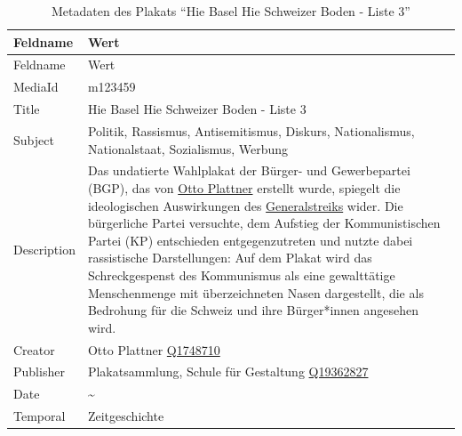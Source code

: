 \documentclass[
  nswissgerman,
  letterpaper,
  DIV=11,
  numbers=noendperiod]{scrartcl}
\begin{document}
\begin{longtable}[]{@{}
  >{\raggedright\arraybackslash}p{}
  >{\raggedright\arraybackslash}p{}@{}}
\caption{Metadaten des Plakats ``Hie Basel Hie Schweizer Boden - Liste
3''}\label{tbl-metadaten-hie-basel-hie-schweizer-boden-liste-3}\tabularnewline
\toprule\noalign{}
\begin{minipage}[b]{\linewidth}\raggedright
Feldname
\end{minipage} & \begin{minipage}[b]{\linewidth}\raggedright
Wert
\end{minipage} \\
\midrule\noalign{}
\endfirsthead
\toprule\noalign{}
\begin{minipage}[b]{\linewidth}\raggedright
Feldname
\end{minipage} & \begin{minipage}[b]{\linewidth}\raggedright
Wert
\end{minipage} \\
\midrule\noalign{}
\endhead
\bottomrule\noalign{}
\endlastfoot
MediaId & m123459 \\
Title & Hie Basel Hie Schweizer Boden - Liste 3 \\
Subject & Politik, Rassismus, Antisemitismus, Diskurs, Nationalismus,
Nationalstaat, Sozialismus, Werbung \\
Description & Das undatierte Wahlplakat der Bürger- und Gewerbepartei
(BGP), das von
\href{https://hls-dhs-dss.ch/de/articles/048316/2010-09-28/}{Otto
Plattner} erstellt wurde, spiegelt die ideologischen Auswirkungen des
\href{https://www.baslerstadtbuch.ch/chronik/1919/08/01/am-donnerstag-31-juli-brach-in-basel-ein-generalstreik-aus.html}{Generalstreiks}
wider. Die bürgerliche Partei versuchte, dem Aufstieg der
Kommunistischen Partei (KP) entschieden entgegenzutreten und nutzte
dabei rassistische Darstellungen: Auf dem Plakat wird das
Schreckgespenst des Kommunismus als eine gewalttätige Menschenmenge mit
überzeichneten Nasen dargestellt, die als Bedrohung für die Schweiz und
ihre Bürger*innen angesehen wird. \\
Creator & Otto Plattner
\href{https://www.wikidata.org/wiki/Q1748710}{Q1748710} \\
Publisher & Plakatsammlung, Schule für Gestaltung
\href{https://www.wikidata.org/wiki/Q19362827}{Q19362827} \\
Date & 1925\textasciitilde{} \\
Temporal & Zeitgeschichte \\

\end{longtable}
\end{document}
